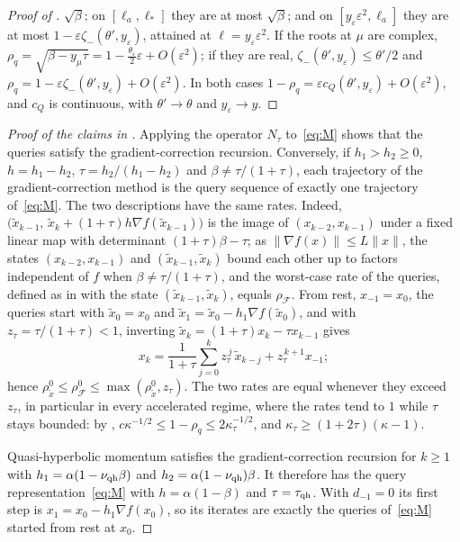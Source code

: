 \documentclass[11pt]{article}
\theoremstyle{definition}
\theoremstyle{remark}
\newcommand{\cF}{\mathcal F}
\newcommand{\norm}[1]{\lVert #1\rVert}
\newcommand{\rhoF}{\rho_{\cF}}
\newcommand{\rhoz}{\rho_{\cF}^{0}}
\newcommand{\cQ}{c_{Q}}
\begin{document}
\begin{proof}[Proof of ]
\(\sqrt\beta\); on \([\ell_a,\ell_*]\) they are at most \(\sqrt\beta\); and on \([y_\varepsilon\varepsilon^2,\ell_a]\) they are at
most \(1-\varepsilon\zeta_-(\theta',y_\varepsilon)\), attained at \(\ell=y_\varepsilon\varepsilon^2\).  If the roots at \(\mu\) are complex,
\(\rho_q=\sqrt{\beta-y_\mu\tau}=1-\frac{\theta_\varepsilon}2\varepsilon+O(\varepsilon^2)\); if they are real,
\(\zeta_-(\theta',y_\varepsilon)\le\theta'/2\) and \(\rho_q=1-\varepsilon\zeta_-(\theta',y_\varepsilon)+O(\varepsilon^2)\).  In both cases
\(1-\rho_q=\varepsilon\cQ(\theta',y_\varepsilon)+O(\varepsilon^2)\), and \(\cQ\) is continuous, with \(\theta'\to\theta\) and
\(y_\varepsilon\to y\).
\end{proof}

\begin{proof}[Proof of the claims in ]
Applying the operator \(N_\tau\) to~\eqref{eq:M} shows that the queries satisfy the gradient-correction
recursion.  Conversely, if \(h_1>h_2\ge0\), \(h=h_1-h_2\), \(\tau=h_2/(h_1-h_2)\) and \(\beta\ne\tau/(1+\tau)\), each trajectory of the
gradient-correction method is the query sequence of exactly one trajectory of~\eqref{eq:M}.
The two descriptions have the same rates.  Indeed, \(\bigl(\tilde x_{k-1},\,\tilde x_k+(1+\tau)h\nabla f(\tilde x_{k-1})\bigr)\) is the image of \((x_{k-2},x_{k-1})\)
under a fixed linear map with determinant \((1+\tau)\beta-\tau\); as \(\norm{\nabla f(x)}\le L\norm x\), the
states \((x_{k-2},x_{k-1})\) and \((\tilde x_{k-1},\tilde x_k)\) bound each other up to factors independent of \(f\)
when \(\beta\ne\tau/(1+\tau)\), and the worst-case
rate of the queries, defined as in  with the state \((\tilde x_{k-1},\tilde x_k)\), equals
\(\rhoF\).  From rest, \(x_{-1}=x_0\), the queries start with \(\tilde x_0=x_0\) and
\(\tilde x_1=\tilde x_0-h_1\nabla f(\tilde x_0)\), and with \(z_\tau=\tau/(1+\tau)<1\), inverting \(\tilde x_k=(1+\tau)x_k-\tau x_{k-1}\) gives
\[
x_k=\frac1{1+\tau}\sum_{j=0}^{k}z_\tau^{\,j}\,\tilde x_{k-j}+z_\tau^{\,k+1}x_{-1};
\]
hence \(\rho^0_{\tilde x}\le\rhoz\le\max(\rho^0_{\tilde x},z_\tau)\).  The two rates are equal whenever they exceed \(z_\tau\), in
particular in every accelerated regime, where the rates tend to \(1\) while \(\tau\) stays bounded: by ,
\(c\kappa^{-1/2}\le1-\rho_q\le2\kappa_\tau^{-1/2}\), and \(\kappa_\tau\ge(1+2\tau)(\kappa-1)\).

Quasi-hyperbolic momentum satisfies the gradient-correction recursion for \(k\ge1\) with
\(h_1=\alpha(1-\nu_{\rm qh}\beta)\) and \(h_2=\alpha(1-\nu_{\rm qh})\beta\).
It therefore has the query representation~\eqref{eq:M} with
\(h=\alpha(1-\beta)\) and \(\tau=\tau_{\rm qh}\).  With \(d_{-1}=0\) its first step is \(x_1=x_0-h_1\nabla f(x_0)\), so its iterates are
exactly the queries of~\eqref{eq:M} started from rest at \(x_0\).
\end{proof}
%
\end{document}
